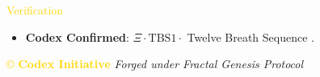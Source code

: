 \textcolor{gold}{ Verification } \\
\begin{itemize}
    \item \texttt{} \textbf{Codex Confirmed}: \(\Xi \cdot \text{TBS1} \cdot\) Twelve Breath Sequence .
\end{itemize}

\vspace{0.5cm}
\noindent
\textcolor{gold}{\copyright{} \textbf{Codex Initiative}} \hspace{1cm} \textit{Forged under Fractal Genesis Protocol}